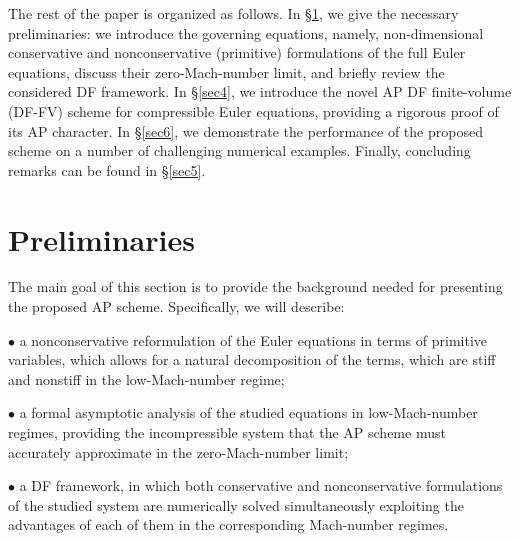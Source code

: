 \documentclass[A4paper,12pt,twoside]{article}
\numberwithin{equation}{section}
\numberwithin{figure}{section}
\numberwithin{table}{section}
\begin{document}
The rest of the paper is organized as follows. In \S\ref{sec2}, we give the necessary preliminaries: we introduce the governing equations,
namely, non-dimensional conservative and nonconservative (primitive) formulations of the full Euler equations, discuss their
zero-Mach-number limit, and briefly review the considered DF framework. In \S\ref{sec4}, we introduce the novel AP DF finite-volume (DF-FV)
scheme for compressible Euler equations, providing a rigorous proof of its AP character. In \S\ref{sec6}, we demonstrate the performance of
the proposed scheme on a number of challenging numerical examples. Finally, concluding remarks can be found in \S\ref{sec5}.

\section{Preliminaries}\label{sec2}
The main goal of this section is to provide the background needed for presenting the proposed AP scheme. Specifically, we will describe:

\smallskip
\noindent
$\bullet$ a nonconservative reformulation of the Euler equations in terms of primitive variables, which allows for a natural decomposition
of the terms, which are stiff and nonstiff in the low-Mach-number regime;

\smallskip
\noindent
$\bullet$ a formal asymptotic analysis of the studied equations in low-Mach-number regimes, providing the incompressible system that the AP
scheme must accurately approximate in the zero-Mach-number limit;

\smallskip
\noindent
$\bullet$
a DF framework, in which both conservative and nonconservative formulations of the studied system are numerically solved simultaneously
exploiting the advantages of each of them in the corresponding Mach-number regimes.
\end{document}
